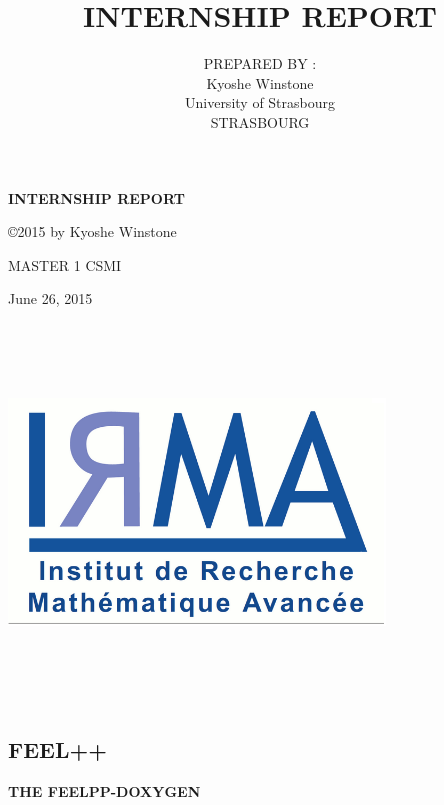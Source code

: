 \documentclass[11pt,utf8]{article}
\title{INTERNSHIP REPORT}
\author{PREPARED BY :\\ Kyoshe Winstone\\University of Strasbourg\\STRASBOURG}
\begin{document}
\begin{center}
\textbf{{\large INTERNSHIP REPORT} }\\ %
\end{center}
\begin{center}
\copyright 2015 by Kyoshe Winstone \\
\end{center}

\begin{center}
MASTER 1 CSMI\\
\end{center}
\begin{center}
June 26, 2015

\end{center}
\begin{center}
 \includegraphics[width=10cm,height=10cm]{p1}
 \end{center}
 \begin{center}
 
\section*{FEEL++  }
\begin{center}
\textbf{{\large  THE FEELPP-DOXYGEN} }\\ %
   \end{center}
\label{weekly report of the internship}

\end{center}
\newpage
\end{document}
